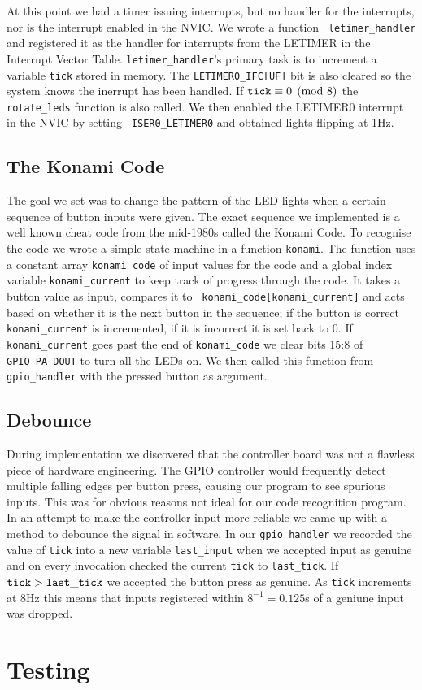 At this point we had a timer issuing interrupts, but no handler for the
interrupts, nor is the interrupt enabled in the NVIC. We wrote a function {\tt
letimer\_handler} and registered it as the handler for interrupts from the
LETIMER in the Interrupt Vector Table. {\tt letimer\_handler}'s primary task is
to increment a variable {\tt tick} stored in memory. The {\tt LETIMER0\_IFC[UF]}
bit is also cleared so the system knows the inerrupt has been handled. If \(
{\tt tick} \equiv 0 \pmod 8 \) the {\tt rotate\_leds} function is also called.
We then enabled the LETIMER0 interrupt in the NVIC by setting {\tt
ISER0\_LETIMER0} and obtained lights flipping at 1Hz.

\subsection{The Konami Code}

The goal we set was to change the pattern of the LED lights when a certain
sequence of button inputs were given. The exact sequence we implemented is a
well known cheat code from the mid-1980s called the Konami Code. To recognise
the code we wrote a simple state machine in a function {\tt konami}. The
function uses a constant array {\tt konami\_code} of input values for the code
and a global index variable {\tt konami\_current} to keep track of progress
through the code. It takes a button value as input, compares it to {\tt
konami\_code[konami\_current]} and acts based on whether it is the next button
in the sequence; if the button is correct {\tt konami\_current} is incremented,
if it is incorrect it is set back to 0. If {\tt konami\_current} goes past the
end of {\tt konami\_code} we clear bits 15:8 of {\tt GPIO\_PA\_DOUT} to turn all
the LEDs on. We then called this function from {\tt gpio\_handler} with the
pressed button as argument.

\subsection{Debounce}

During implementation we discovered that the controller board was not a flawless
piece of hardware engineering. The GPIO controller would frequently detect
multiple falling edges per button press, causing our program to see spurious
inputs. This was for obvious reasons not ideal for our code recognition program.
In an attempt to make the controller input more reliable we came up with a
method to debounce the signal in software. In our {\tt gpio\_handler} we
recorded the value of {\tt tick} into a new variable {\tt last\_input} when we
accepted input as genuine and on every invocation checked the current {\tt tick}
to {\tt last\_tick}. If \({\tt tick} > {\tt last\_tick}\) we accepted the button
press as genuine. As {\tt tick} increments at 8Hz this means that inputs
registered within \(8^{-1} = 0.125\)s of a geniune input was dropped.


\section{Testing}
